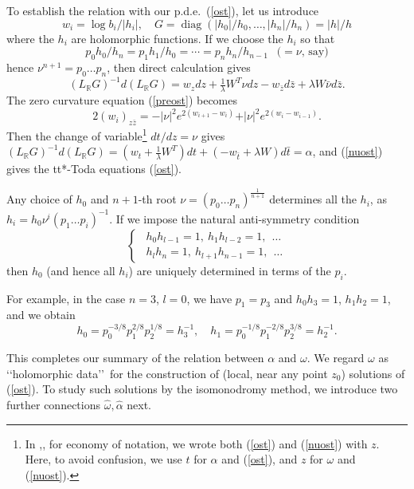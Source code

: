 \documentclass[a4paper,12pt,leqno]{amsart}
\numberwithin{equation}{section}
\theoremstyle{plain}
\theoremstyle{definition}
\newcommand{\R}{\mathbb R}
\newcommand{\al}{\alpha}
\newcommand{\la}{\lambda}
\newcommand{\om}{\omega}
\DeclareMathOperator{\diag}{diag}
\renewcommand{\ll}{\lq\lq}
\newcommand{\rr}{\rq\rq\ }
\newcommand{\zbar}{  {\bar z}  }
\newcommand{\zzb}{ {z\bar z}  }
\newcommand{\tbar}{  {\bar t}  }
\begin{document}
To establish the relation with our p.d.e.\  (\ref{ost}), let us introduce
\begin{equation}\label{definitionofwi}
w_i=\log b_i/\vert h_i\vert,\quad
G=\diag( \vert h_0\vert/h_0, \dots, \vert h_n\vert/h_n )=\vert h\vert/h
\end{equation}
where the $h_i$ are holomorphic functions.
If we choose the $h_i$ so that
\begin{equation}\label{nu}
p_0h_0/h_n = p_1 h_1/h_0 = \cdots = p_n h_n/h_{n-1} 
\ \  \text{ ($=\nu$, say)}
\end{equation}
hence $\nu^{n+1}=p_0\dots p_n$,
then direct calculation gives 
\[
(L_\R G)^{-1} d(L_\R G) =
w_z dz +\tfrac1\la W^T \nu dz - w_{\zbar} d\zbar + \la W \bar\nu d\zbar.
\]
The zero curvature equation (\ref{preost}) becomes
\begin{equation}\label{nuost}
2(w_i)_{\zzb}=
-\vert \nu\vert^2 e^{2(w_{i+1}-w_{i})} 
+ \vert \nu \vert^2 e^{2(w_{i}-w_{i-1})}.
\end{equation}
Then the change of variable\footnote{In \cite{GuItLiXX},\cite{GuItLi15}, for economy of notation, we wrote both (\ref{ost}) and (\ref{nuost}) with $z$.  Here, to avoid confusion,  we use $t$ for $\al$ and (\ref{ost}), and
$z$ for $\om$ and (\ref{nuost}).
}
$dt/dz=\nu$ gives 
$(L_\R G)^{-1} d(L_\R G) =
(w_t+\tfrac1\la W^T)dt + (-w_{\tbar}+\la W)d\tbar = \al$, and (\ref{nuost}) gives the tt*-Toda equations (\ref{ost}). 

Any choice of $h_0$ and $n+1$-th root
$\nu=(p_0\dots p_n)^{\frac1{n+1}}$ determines all the $h_i$, as
$h_i=h_0 \nu^i (p_1\dots p_i)^{-1}$.   If we impose the natural anti-symmetry  condition
\begin{equation*}
\begin{cases}
\ \  h_0h_{l-1}=1, \ h_1h_{l-2}=1,\ \ \dots\\
\ \  h_lh_{n}=1, \ h_{l+1}h_{n-1}=1,\ \ \dots
 \end{cases}
\end{equation*}
then $h_0$ (and hence all $h_i$) are uniquely determined in terms of the $p_i$. 

For example, in the case $n=3$, $l=0$, we have
$p_1=p_3$ and $h_0h_3=1$, $h_1h_2=1$, and we obtain
\begin{equation}\label{hzerohone}
h_0=p_0^{-3/8}p_1^{2/8}p_2^{1/8}=h_3^{-1},
\quad
h_1=p_0^{-1/8}p_1^{-2/8}p_2^{3/8}=h_2^{-1}.
\end{equation}

This completes our summary of the relation between $\al$ and $\om$.  We regard $\om$ as \ll holomorphic data\rr for the construction of (local, near any point $z_0$) solutions of (\ref{ost}). To study such solutions by the isomonodromy method, we introduce two further connections $\hat\om,\hat\al$ next.  
\end{document}
